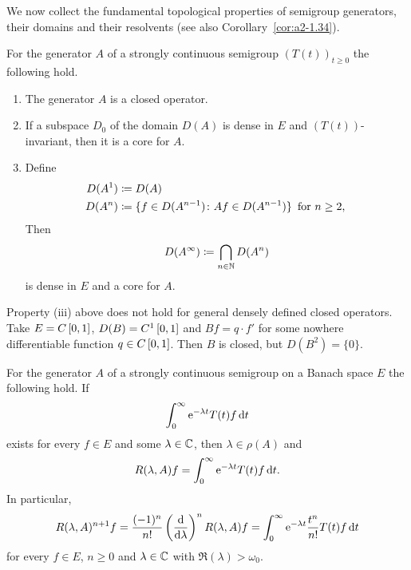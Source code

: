 We now collect the fundamental topological properties of semigroup generators, their domains and their resolvents
(see also Corollary~\ref{cor:a2-1.34}).
\begin{proposition}\label{prop:a1-1.9}
For the generator $A$ of a strongly continuous semigroup $(T(t))_{t \geq 0}$ the following hold.
\begin{enumerate}[\upshape(i)]
\item 
The generator $A$ is a closed operator.

\item
If a subspace $D_{0}$ of the domain $D(A)$ is dense in $E$ and $(T(t))$-invariant, then it is a core for $A$.
\item Define 
%
\begin{align*}
	D(A^{1}) & \coloneq D(A) \\
	D(A^{n}) & \coloneq \{f \in D(A^{n-1}) \colon Af \in D(A^{n-1})\} \, \text{ for $ n \geq 2 $, }
\end{align*}
%
Then %
\[
	D(A^{\infty}) \coloneq \bigcap_{n \in \mathbb{N}} D(A^{n})
\]
%
is dense in $E$ and a core for $A$.
\end{enumerate}
\end{proposition}
\begin{example}\label{ex:a1-1.10}
Property (iii) above does not hold for general densely defined closed operators.
Take $E = C\left[ 0,1 \right]$, $D(B) = C^{1}\left[ 0,1 \right]$ and $Bf = q \cdot f'$ for some nowhere differentiable function $q \in C\left[ 0,1 \right]$.
Then $B$ is closed, but $D(B^{2}) = \{0\}$.
\end{example}
\begin{proposition}\label{prop:a1-1.11}
For the generator $A$ of a strongly continuous semigroup on a Banach space $E$ the following hold.
If %
\[
	 \int_{0}^{\infty}  \mathrm{e}^{-\lambda t}T(t)f \mathop{}\!\mathrm{d}{t} 
\]
%
exists for every $f \in E$ and some $\lambda \in \mathbb{C}$, then $\lambda \in \rho(A)$ and 
%
\[
	R(\lambda,A)f = \int_{0}^{\infty}  \mathrm{e}^{-\lambda t}T(t)f  \mathop{}\!\mathrm{d}{t}.
\]
%
In particular,
\begin{equation}\label{eq:a1-1.7}
R(\lambda,A)^{n+1}f 
	= \frac{(-1)^{n}}{n!}\left(\frac{\mathop{}\!\mathrm{d}{ }}{\mathop{}\!\mathrm{d}{\lambda}}\right)^{n} R(\lambda,A)f 
	= \int_{0}^{\infty}  \mathrm{e}^{-\lambda t}\frac{t^{n}}{n!}T(t)f  \mathop{}\!\mathrm{d}{t}
\end{equation}
for every $f \in E$, $n \geq 0$ and $\lambda \in \mathbb{C}$ with $\Re(\lambda) > \omega_{0}$.
\end{proposition}
